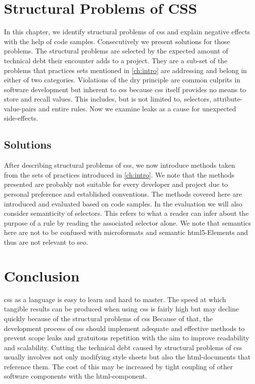

\chapter{Structural Problems of CSS}
In this chapter, we identify structural problems of \gls{css} and explain negative effects with the help of code samples.
Consecutively we present solutions for those problems.
The structural problems are selected by the expected amount of technical debt their encounter adds to a project.
They are a sub-set of the problems that practices sets mentioned in \autoref{ch:intro} are addressing and belong in either of two categories.
Violations of the \gls{dry} principle are common culprits in software development but inherent to \gls{css} because \gls{css} itself provides no means to store and recall values.
This includes, but is not limited to, selectors, attribute-value-pairs and entire rules.
Now we examine leaks as a cause for unexpected side-effects.




\section{Solutions}
After describing structural problems of \gls{css}, we now introduce methods taken from the sets of practices introduced in \autoref{ch:intro}.
We note that the methods presented are probably not suitable for every developer and project due to personal preference and established conventions.
The methods covered here are introduced and evaluated based on code samples.
In the evaluation we will also consider semanticity of selectors.
This refers to what a reader can infer about the purpose of a rule by reading the associated selector alone.
We note that semantics here are not to be confused with microformats and semantic \gls{html}5-Elements and thus are not relevant to \gls{seo}.




\chapter{Conclusion}
\gls{css} as a language is easy to learn and hard to master.
The speed at which tangible results can be produced when using \gls{css} is fairly high but may decline quickly because of the structural problems of \gls{css}
Because of that, the development process of \gls{css} should implement adequate and effective methods to prevent scope leaks and gratuitous repetition with the aim to improve readability and scalability.
Cutting the technical debt caused by structural problems of \gls{css} usually involves not only modifying style sheets but also the \gls{html}-documents that reference them.
The cost of this may be increased by tight coupling of other software components with the \gls{html}-component.

